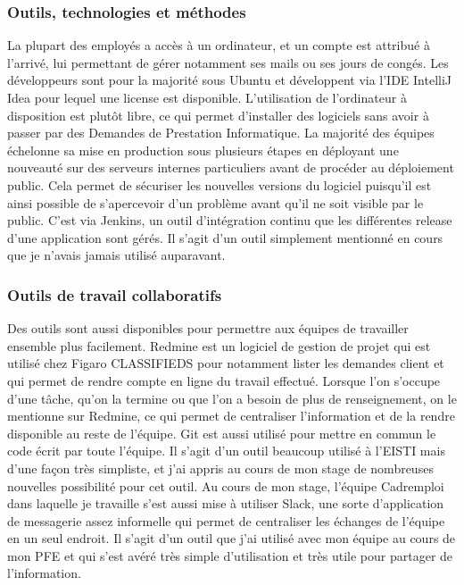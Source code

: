 \subsubsection{Outils, technologies et méthodes}
\label{subs:Outils, technologies et methodes}
La plupart des employés a accès à un ordinateur, et un compte est attribué à l'arrivé, lui permettant de gérer notamment ses mails ou ses jours de congés.
Les développeurs sont pour la majorité sous Ubuntu et développent via l'IDE IntelliJ Idea pour lequel une license est disponible.
L'utilisation de l'ordinateur à disposition est plutôt libre, ce qui permet d'installer des logiciels sans avoir à passer par des Demandes de Prestation Informatique.
La majorité des équipes échelonne sa mise en production sous plusieurs étapes en déployant une nouveauté sur des serveurs internes particuliers avant de procéder au déploiement public.
Cela permet de sécuriser les nouvelles versions du logiciel puisqu'il est ainsi possible de s'apercevoir d'un problème avant qu'il ne soit visible par le public.
C'est via Jenkins, un outil d'intégration continu que les différentes release d'une application sont gérés.
Il s'agit d'un outil simplement mentionné en cours que je n'avais jamais utilisé auparavant.

\subsubsection{Outils de travail collaboratifs}
\label{subs:Outils de travail collaboratifs}
Des outils sont aussi disponibles pour permettre aux équipes de travailler ensemble plus facilement.
Redmine est un logiciel de gestion de projet qui est utilisé chez Figaro CLASSIFIEDS pour notamment lister les demandes client et qui permet de rendre compte en ligne du travail effectué.
Lorsque l'on s'occupe d'une tâche, qu'on la termine ou que l'on a besoin de plus de renseignement, on le mentionne sur Redmine, ce qui permet de centraliser l'information et de la rendre disponible au reste de l'équipe.
Git est aussi utilisé pour mettre en commun le code écrit par toute l'équipe.
Il s'agit d'un outil beaucoup utilisé à l'EISTI mais d'une façon très simpliste, et j'ai appris au cours de mon stage de nombreuses nouvelles possibilité pour cet outil.
Au cours de mon stage, l'équipe Cadremploi dans laquelle je travaille s'est aussi mise à utiliser Slack, une sorte d'application de messagerie assez informelle qui permet de centraliser les échanges de l'équipe en un seul endroit.
Il s'agit d'un outil que j'ai utilisé avec mon équipe au cours de mon PFE et qui s'est avéré très simple d'utilisation et très utile pour partager de l'information.


